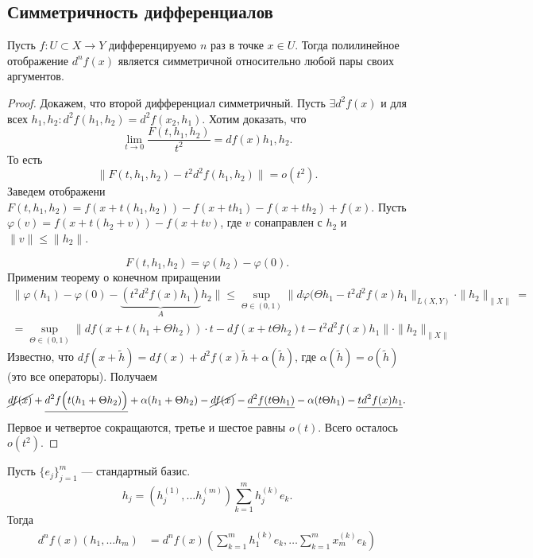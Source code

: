 \subsection{Симметричность дифференциалов}
\begin{thm}
    Пусть $ f\colon U \subset X \to  Y$ дифференцируемо $ n$ раз  в точке  $ x \in U$. Тогда полилинейное отображение $ d^{n}f(x)$ является симметричной относительно любой пары своих аргументов.
\end{thm}
\begin{proof}
    Докажем, что второй дифференциал симметричный.  Пусть $ \exists d^{2}f(x)$ и для всех $ h_1, h_2\colon d^2f(h_1, h_2) = d^2f(x_2, h_1)$.  
    Хотим доказать, что
    \[
	\lim_{t \to  0}\frac{F(t, h_1, h_2 )}{t^2} = df(x) h_1,h_2
    .\] 
    То есть
    \[
	\| F(t, h_1, h_2) - t^2 d^2f(h_1,h_2) \| = o(t^2) 
    .\] 
    Заведем отображени $ F(t, h_1, h_2) = f(x + t(h_1, h_2)) - f(x +th_1) - f(x + th_2) + f(x)$.
    Пусть $ \varphi (v) = f(x+ t(h_2 + v)) - f(x+tv)$, где $ v$ сонаправлен с  $ h_2$ и $ \| v \| \le  \| h_2 \| $.

    \[
	F(t, h_1, h_2) = \varphi (h_2) - \varphi (0)
    .\] 
Применим теорему о конечном приращении
\begin{align*}
    \|  \varphi (h_1) - \varphi (0) - \underbrace{(t^2 d^2f(x)h_1)}_{A}h_2 \| \le \sup_{\Theta \in (0, 1)}  \| d \varphi (\Theta h_1 - t^2 d^2f(x)h_1 \|_{L(X, Y)}  \cdot \| h_2 \|_{\| X \| }  = \\
    = \sup_{\Theta \in (0, 1)} \| df(x + t(h_1 + \Theta h_2)) \cdot  t  - df(x + t \Theta h_2)t -t^2d^2f(x)h_1\| \cdot \| h_2 \| _{\| X \| }  
\end{align*}
Известно, что $ df(x + \tilde h) = df(x) + d^2f(x) \tilde h + \alpha (\tilde h)$, где $ \alpha (\tilde h) = o(\tilde h)$ (это все операторы).
Получаем
\[
    \cancel {df(x)} + \underline{d^2f \Bigl(t (h_1 + \Theta h_2)\Bigr)} + \alpha (h_1+ \Theta h_2) - \cancel{df(x)} - \underline{d^2f(t \Theta h_1)} - \alpha (t\Theta h_1) - \underline{td^2f(x)h_1}
.\] 
Первое и четвертое сокращаются, третье и шестое равны $ o(t)$.
Всего осталось  $ o(t^2)$.
\end{proof}
\begin{thm}[частный случай, $ X = \R^{m} ~\R^{n}$]
    Пусть $ \{e_j\}_{j=1}^{m}$ --- стандартный базис.
    \[
	h_j = \left( h_j^{(1)}, \ldots h_j^{(m)} \right)  \sum_{k=1}^{m} h_{j}^{(k)} e_k 
    .\] 
    Тогда
    \begin{align*}
	d^{n}f(x) (h_1, \ldots h_m) & = d^{n}f(x) \left( \sum_{k=1}^{m} h_1^{(k)} e_k, \ldots \sum_{k=1}^{m} x_m^{(k)}e_k \right) 
    \end{align*}
\end{thm}
